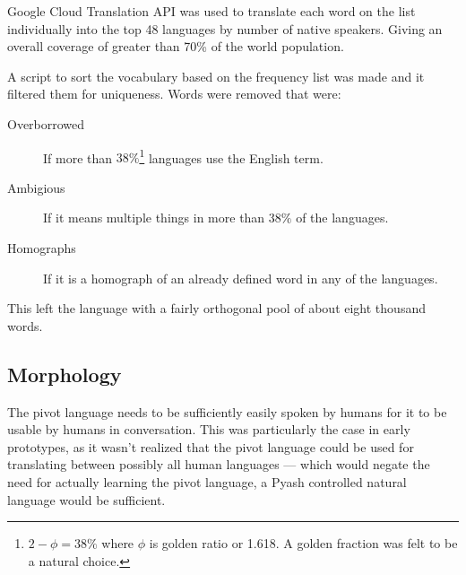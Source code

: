 Google Cloud Translation API\cite{googleTranslate} was used
to translate each word on the list individually into the top 48 languages by 
number of native speakers. Giving an overall coverage of greater than 70\% of
the world population.

A script to sort the vocabulary based on the frequency
list\cite{GutenbergFL} was made and it filtered them for uniqueness. 
Words were removed that were:

\begin{description}
  \item[Overborrowed] If more than $38\%$\footnote{$2-\phi = 38\%$ where $\phi$
    is golden ratio or 1.618. A golden fraction was felt to be a natural choice.} 
    languages use the English term. 
  \item[Ambigious] If it means multiple things in more than $38\%$ of the
    languages. 
  \item[Homographs] If it is a homograph of an already defined word in any of the
    languages. 
\end{description}

This left the language with a fairly orthogonal pool of about eight thousand words. 

\subsection{Morphology}\label{morphology}
The pivot language needs to be sufficiently easily spoken by humans 
for it to be usable by humans in conversation. This was particularly the case
in early prototypes, as it wasn't realized that the pivot language could be
used for translating between possibly all human languages --- which would negate
the need for actually learning the pivot language, a Pyash controlled 
natural language would be sufficient. 

